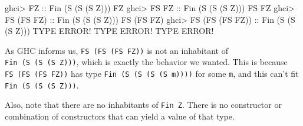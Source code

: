 \documentclass[]{article}
\newenvironment{Shaded}{}{}
\newcommand{\DataTypeTok}[1]{\textcolor[rgb]{0.56,0.13,0.00}{#1}}
\newcommand{\NormalTok}[1]{#1}
\newcommand{\OperatorTok}[1]{\textcolor[rgb]{0.40,0.40,0.40}{#1}}
\newcommand{\OtherTok}[1]{\textcolor[rgb]{0.00,0.44,0.13}{#1}}
\begin{document}
\begin{Shaded}
\begin{Highlighting}[]
\NormalTok{ghci}\OperatorTok{>} \DataTypeTok{FZ}\OtherTok{              ::} \DataTypeTok{Fin}\NormalTok{ (}\DataTypeTok{\textquotesingle{}S}\NormalTok{ (}\DataTypeTok{\textquotesingle{}S}\NormalTok{ (}\DataTypeTok{\textquotesingle{}S} \DataTypeTok{\textquotesingle{}Z}\NormalTok{)))}
\DataTypeTok{FZ}
\NormalTok{ghci}\OperatorTok{>} \DataTypeTok{FS} \DataTypeTok{FZ}\OtherTok{           ::} \DataTypeTok{Fin}\NormalTok{ (}\DataTypeTok{\textquotesingle{}S}\NormalTok{ (}\DataTypeTok{\textquotesingle{}S}\NormalTok{ (}\DataTypeTok{\textquotesingle{}S} \DataTypeTok{\textquotesingle{}Z}\NormalTok{)))}
\DataTypeTok{FS} \DataTypeTok{FZ}
\NormalTok{ghci}\OperatorTok{>} \DataTypeTok{FS}\NormalTok{ (}\DataTypeTok{FS} \DataTypeTok{FZ}\NormalTok{)}\OtherTok{      ::} \DataTypeTok{Fin}\NormalTok{ (}\DataTypeTok{\textquotesingle{}S}\NormalTok{ (}\DataTypeTok{\textquotesingle{}S}\NormalTok{ (}\DataTypeTok{\textquotesingle{}S} \DataTypeTok{\textquotesingle{}Z}\NormalTok{)))}
\DataTypeTok{FS}\NormalTok{ (}\DataTypeTok{FS} \DataTypeTok{FZ}\NormalTok{)}
\NormalTok{ghci}\OperatorTok{>} \DataTypeTok{FS}\NormalTok{ (}\DataTypeTok{FS}\NormalTok{ (}\DataTypeTok{FS} \DataTypeTok{FZ}\NormalTok{))}\OtherTok{ ::} \DataTypeTok{Fin}\NormalTok{ (}\DataTypeTok{\textquotesingle{}S}\NormalTok{ (}\DataTypeTok{\textquotesingle{}S}\NormalTok{ (}\DataTypeTok{\textquotesingle{}S} \DataTypeTok{\textquotesingle{}Z}\NormalTok{)))}
\DataTypeTok{TYPE} \DataTypeTok{ERROR}\OperatorTok{!}  \DataTypeTok{TYPE} \DataTypeTok{ERROR}\OperatorTok{!}  \DataTypeTok{TYPE} \DataTypeTok{ERROR}\OperatorTok{!}
\end{Highlighting}
\end{Shaded}

As GHC informs us, \texttt{FS\ (FS\ (FS\ FZ))} is not an inhabitant of
\texttt{Fin\ (\textquotesingle{}S\ (\textquotesingle{}S\ (\textquotesingle{}S\ \textquotesingle{}Z)))},
which is exactly the behavior we wanted. This is because
\texttt{FS\ (FS\ (FS\ FZ))} has type
\texttt{Fin\ (\textquotesingle{}S\ (\textquotesingle{}S\ (\textquotesingle{}S\ (\textquotesingle{}S\ m))))}
for some \texttt{m}, and this can't fit
\texttt{Fin\ (\textquotesingle{}S\ (\textquotesingle{}S\ (\textquotesingle{}S\ \textquotesingle{}Z)))}.

Also, note that there are no inhabitants of \texttt{Fin\ \textquotesingle{}Z}.
There is no constructor or combination of constructors that can yield a value of
that type.
\end{document}
